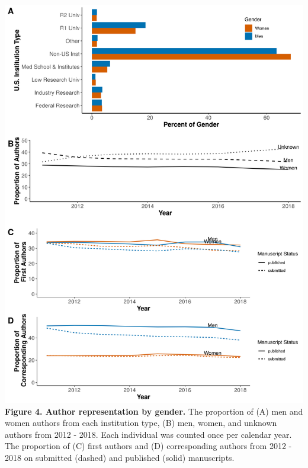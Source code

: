 \documentclass[11pt,]{article}
\begin{document}
\newpage

\includegraphics{Figure_3.png} \textbf{Figure 4. Author representation
by gender.} The proportion of (A) men and women authors from each
institution type, (B) men, women, and unknown authors from 2012 - 2018.
Each individual was counted once per calendar year. The proportion of
(C) first authors and (D) corresponding authors from 2012 - 2018 on
submitted (dashed) and published (solid) manuscripts.

\newpage
\end{document}
